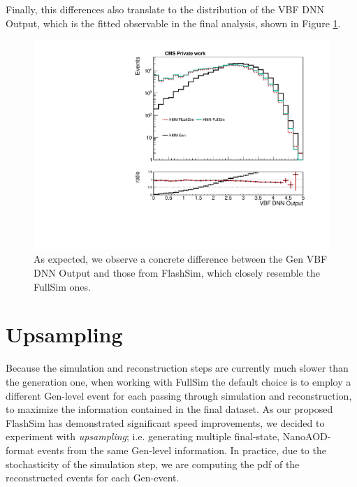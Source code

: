   Finally, this differences also translate to the distribution of the VBF DNN Output, which is the fitted observable in the final analysis, shown in Figure \ref{fig:dnngen}.
  
  \begin{figure}
    \centering
    \includegraphics[width=\linewidth]{gfx/ch6/gen_vs_flash_DNN18Atan_noqgl___PreSel_log.pdf}
    \caption[Gen vs FlashSim for VBF DNN]{As expected, we observe a concrete difference between the Gen VBF DNN Output and those from FlashSim, which closely resemble the FullSim ones.}
    \label{fig:dnngen}
   \end{figure}
   
\section{Upsampling}
  Because the simulation and reconstruction steps are currently much slower than the generation one, when working with FullSim the default choice is to employ a different Gen-level event for each passing through simulation and reconstruction, to maximize the information contained in the final dataset. As our proposed FlashSim has demonstrated significant speed improvements, we decided to experiment with \emph{upsampling}; i.e. generating multiple final-state, NanoAOD-format events from the same Gen-level information. In practice, due to the stochasticity of the simulation step, we are computing the pdf of the reconstructed events for each Gen-event. 
  
